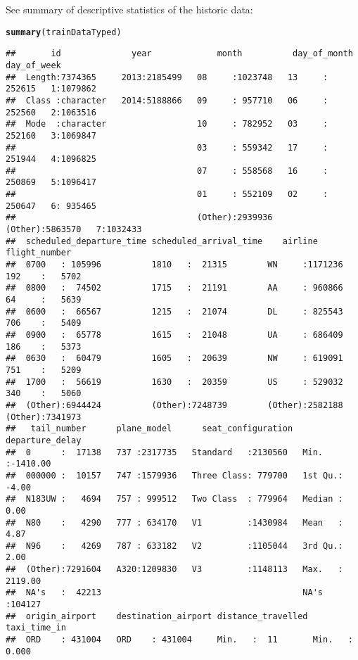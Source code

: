 \documentclass{article}\usepackage[]{graphicx}\usepackage[]{color}
\makeatletter
\newcommand{\hlstd}[1]{\textcolor[rgb]{0.345,0.345,0.345}{#1}}%
\newcommand{\hlkwd}[1]{\textcolor[rgb]{0.737,0.353,0.396}{\textbf{#1}}}%
\newenvironment{kframe}{%
 \def\at@end@of@kframe{}%
 \ifinner\ifhmode%
  \def\at@end@of@kframe{\end{minipage}}%
  \begin{minipage}{\columnwidth}%
 \fi\fi%
 \def\FrameCommand##1{\hskip\@totalleftmargin \hskip-\fboxsep
 \colorbox{shadecolor}{##1}\hskip-\fboxsep
     \hskip-\linewidth \hskip-\@totalleftmargin \hskip\columnwidth}%
 \MakeFramed {\advance\hsize-\width
   \@totalleftmargin\z@ \linewidth\hsize
   \@setminipage}}%
 {\par\unskip\endMakeFramed%
 \at@end@of@kframe}
\newenvironment{knitrout}{}{} %
\makeatother
\begin{document}
See summary of descriptive statistics of the historic data: 
\begin{knitrout}
\color{fgcolor}\begin{kframe}
\begin{alltt}
\hlkwd{summary}\hlstd{(trainDataTyped)}
\end{alltt}
\begin{verbatim}
##       id              year             month          day_of_month     day_of_week
##  Length:7374365     2013:2185499   08     :1023748   13     : 252615   1:1079862  
##  Class :character   2014:5188866   09     : 957710   06     : 252560   2:1063516  
##  Mode  :character                  10     : 782952   03     : 252160   3:1069847  
##                                    03     : 559342   17     : 251944   4:1096825  
##                                    07     : 558568   16     : 250869   5:1096417  
##                                    01     : 552109   02     : 250647   6: 935465  
##                                    (Other):2939936   (Other):5863570   7:1032433  
##  scheduled_departure_time scheduled_arrival_time    airline        flight_number    
##  0700   : 105996          1810   :  21315        WN     :1171236   192    :   5702  
##  0800   :  74502          1715   :  21191        AA     : 960866   64     :   5639  
##  0600   :  66567          1215   :  21074        DL     : 825543   706    :   5409  
##  0900   :  65778          1615   :  21048        UA     : 686409   186    :   5373  
##  0630   :  60479          1605   :  20639        NW     : 619091   751    :   5209  
##  1700   :  56619          1630   :  20359        US     : 529032   340    :   5060  
##  (Other):6944424          (Other):7248739        (Other):2582188   (Other):7341973  
##   tail_number      plane_model      seat_configuration  departure_delay   
##  0      :  17138   737 :2317735   Standard   :2130560   Min.   :-1410.00  
##  000000 :  10157   747 :1579936   Three Class: 779700   1st Qu.:   -4.00  
##  N183UW :   4694   757 : 999512   Two Class  : 779964   Median :    0.00  
##  N80    :   4290   777 : 634170   V1         :1430984   Mean   :    4.87  
##  N96    :   4269   787 : 633182   V2         :1105044   3rd Qu.:    2.00  
##  (Other):7291604   A320:1209830   V3         :1148113   Max.   : 2119.00  
##  NA's   :  42213                                        NA's   :104127    
##  origin_airport    destination_airport distance_travelled  taxi_time_in     
##  ORD    : 431004   ORD    : 431004     Min.   :  11       Min.   :   0.000  

\end{verbatim}
\end{kframe}
\end{knitrout}
\end{document}
